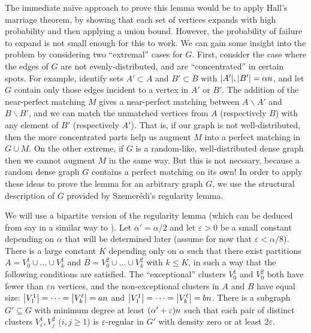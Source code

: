 \documentclass[11pt,english]{article}
\theoremstyle{plain}
\theoremstyle{definition}
\theoremstyle{definition}
\theoremstyle{plain}
\theoremstyle{plain}
\theoremstyle{plain}
\theoremstyle{plain}
\theoremstyle{remark}
\theoremstyle{remark}
\let\originalleft\left
\let\originalright\right
\renewcommand{\left}{\mathopen{}\mathclose\bgroup\originalleft}
\renewcommand{\right}{\aftergroup\egroup\originalright}
\begin{document}
The immediate na\"ive approach to prove this lemma would be to apply
Hall's marriage theorem, by showing that each set of vertices expands
with high probability and then applying a union bound. However, the
probability of failure to expand is not small enough for this to work.
We can gain some insight into the problem by considering two ``extremal''
cases for $G$. First, consider the case where the edges of $G$ are
not evenly-distributed, and are ``concentrated'' in certain spots.
For example, identify sets $A'\subset A$ and $B'\subset B$ with
$\left|A'\right|,\left|B'\right|=\alpha n$, and let $G$ contain
only those edges incident to a vertex in $A'$ or $B'$. The addition
of the near-perfect matching $M$ gives a near-perfect matching between
$A\backslash A'$ and $B\backslash B'$, and we can match the unmatched
vertices from $A$ (respectively $B$) with any element of $B'$ (respectively
$A'$). That is, if our graph is not well-distributed, then the more
concentrated parts help us augment $M$ into a perfect matching in
$G\cup M$. On the other extreme, if $G$ is a random-like, well-distributed
dense graph then we cannot augment $M$ in the same way. But this
is not necssary, because a random dense graph $G$ contains a perfect
matching on its own! In order to apply these ideas to prove the lemma
for an arbitrary graph $G$, we use the structural description of
$G$ provided by Szemer\'edi's regularity lemma.

We will use a bipartite version of the regularity lemma (which can
be deduced from say \cite[Theorem~2.3]{Tao05} in a similar way to
\cite[Theorem~1.10]{KS96}). Let $\alpha'=\alpha/2$ and let $\varepsilon>0$
be a small constant depending on $\alpha$ that will be determined
later (assume for now that $\varepsilon<\alpha/8$). There is a large
constant $K$ depending only on $\alpha$ such that there exist partitions
$A=V_{0}^{1}\cup\dots\cup V_{k}^{1}$ and $B=V_{0}^{2}\cup\dots\cup V_{k}^{2}$
with $k\le K$, in such a way that the following conditions are satisfied.
The ``exceptional'' clusters $V_{0}^{1}$ and $V_{0}^{2}$ both
have fewer than $\varepsilon n$ vertices, and the non-exceptional
clusters in $A$ and $B$ have equal size: $\left|V_{1}^{1}\right|=\dots=\left|V_{k}^{\ell}\right|=an$
and $\left|V_{1}^{1}\right|=\dots=\left|V_{k}^{\ell}\right|=bn$.
There is a subgraph $G'\subseteq G$ with minimum degree at least
$\left(\alpha'+\varepsilon\right)n$ such that each pair of distinct
clusters $V_{i}^{1},V_{j}^{2}$ ($i,j\ge1$) is $\varepsilon$-regular
in $G'$ with density zero or at least $2\varepsilon$.
\end{document}
